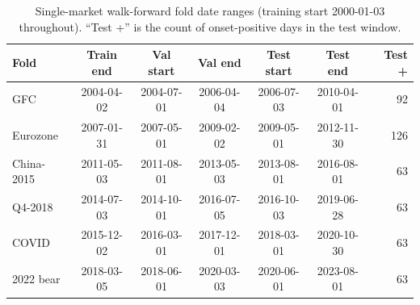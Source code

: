 \documentclass[11pt,a4paper]{article}
\begin{document}
\begin{table}[h]
\centering\small
\caption{Single-market walk-forward fold date ranges (training start
2000-01-03 throughout). ``Test +'' is the count of onset-positive days in the
test window.}
\label{tab:folddates}
\begin{tabular}{lcccccr}
\toprule
Fold & Train end & Val start & Val end & Test start & Test end & Test + \\
\midrule
GFC         & 2004-04-02 & 2004-07-01 & 2006-04-04 & 2006-07-03 & 2010-04-01 & 92 \\
Eurozone    & 2007-01-31 & 2007-05-01 & 2009-02-02 & 2009-05-01 & 2012-11-30 & 126 \\
China-2015  & 2011-05-03 & 2011-08-01 & 2013-05-03 & 2013-08-01 & 2016-08-01 & 63 \\
Q4-2018     & 2014-07-03 & 2014-10-01 & 2016-07-05 & 2016-10-03 & 2019-06-28 & 63 \\
COVID       & 2015-12-02 & 2016-03-01 & 2017-12-01 & 2018-03-01 & 2020-10-30 & 63 \\
2022 bear   & 2018-03-05 & 2018-06-01 & 2020-03-03 & 2020-06-01 & 2023-08-01 & 63 \\
\bottomrule
\end{tabular}
\end{table}
\end{document}
